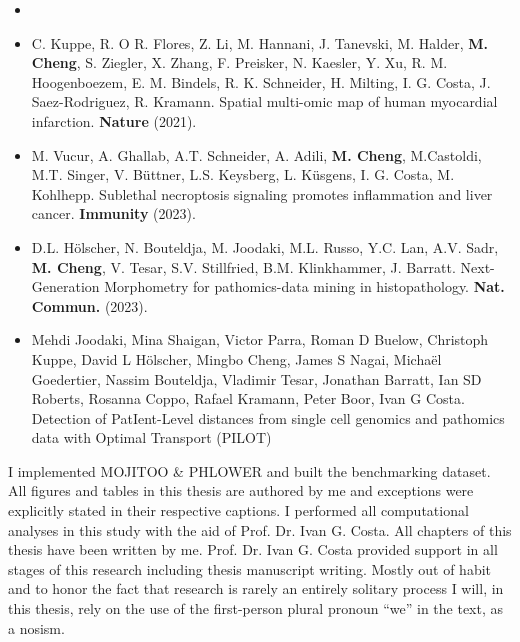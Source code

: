 \begin{addmargin}{0.02\textwidth}
	\begin{itemize}
	\item 	\item C. Kuppe, R. O R. Flores, Z. Li, M. Hannani, J. Tanevski, M. Halder, \textbf{M. Cheng}, S. Ziegler, X. Zhang, F. Preisker, N. Kaesler, Y. Xu, R. M. Hoogenboezem, E. M. Bindels, R. K. Schneider, H. Milting, I. G. Costa, J. Saez-Rodriguez, R. Kramann. Spatial multi-omic map of human myocardial infarction. \textbf{Nature} (2021).
    \end{itemize}
\end{addmargin}


\begin{addmargin}{0.02\textwidth}
	\begin{itemize}
	\item M. Vucur,  A. Ghallab, A.T. Schneider, A. Adili,  \textbf{M. Cheng},  M.Castoldi, M.T. Singer,  V. Büttner, L.S. Keysberg, L. Küsgens, I. G. Costa, M. Kohlhepp.  Sublethal necroptosis signaling promotes inflammation and liver cancer. \textbf{Immunity} (2023).
	\end{itemize}
\end{addmargin}

\begin{addmargin}{0.02\textwidth}
	\begin{itemize}
	\item  D.L. Hölscher, N. Bouteldja, M. Joodaki, M.L. Russo, Y.C. Lan, A.V. Sadr, \textbf{M. Cheng}, V. Tesar, S.V. Stillfried, B.M. Klinkhammer, J. Barratt. Next-Generation Morphometry for pathomics-data mining in histopathology. \textbf{Nat. Commun.} (2023).
	\end{itemize}
\end{addmargin}

\begin{addmargin}{0.02\textwidth}
	\begin{itemize}
	\item Mehdi Joodaki, Mina Shaigan, Victor Parra, Roman D Buelow, Christoph Kuppe, David L Hölscher, Mingbo Cheng, James S Nagai, Michaël Goedertier, Nassim Bouteldja, Vladimir Tesar, Jonathan Barratt, Ian SD Roberts, Rosanna Coppo, Rafael Kramann, Peter Boor, Ivan G Costa. Detection of PatIent-Level distances from single cell genomics and pathomics data with Optimal Transport (PILOT)
	\end{itemize}
\end{addmargin}


I implemented MOJITOO \& PHLOWER and built the benchmarking dataset. All figures and tables in this thesis are authored by me and exceptions were explicitly stated in their respective captions. I performed all computational analyses in this study with the aid of Prof. Dr. Ivan G. Costa. All chapters of this thesis have been written by me. Prof. Dr. Ivan G. Costa provided support in all stages of this research including thesis manuscript writing. Mostly out of habit and to honor the fact that research is rarely an entirely solitary process I will, in this thesis, rely on the use of the first-person plural pronoun ``we'' in the text, as a nosism.





